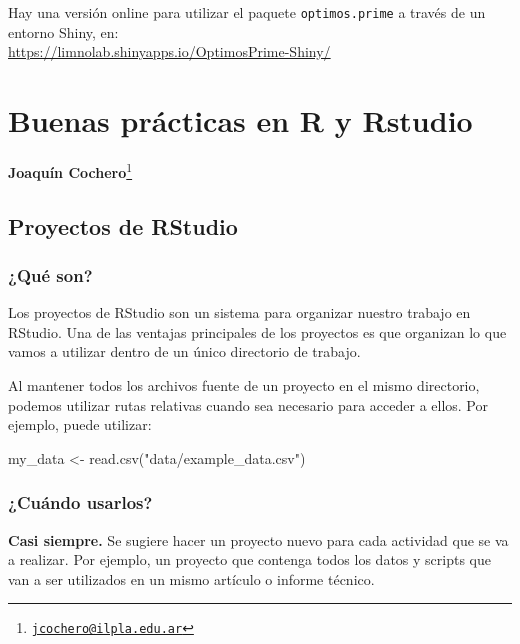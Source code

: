 \documentclass[
]{book}
\newenvironment{Shaded}{\begin{snugshade}}{\end{snugshade}}
\newcommand{\FunctionTok}[1]{\textcolor[rgb]{0.00,0.00,0.00}{#1}}
\newcommand{\NormalTok}[1]{#1}
\newcommand{\OtherTok}[1]{\textcolor[rgb]{0.56,0.35,0.01}{#1}}
\newcommand{\StringTok}[1]{\textcolor[rgb]{0.31,0.60,0.02}{#1}}
\begin{document}
Hay una versión online para utilizar el paquete \texttt{optimos.prime} a través de un entorno Shiny, en:\\
\url{https://limnolab.shinyapps.io/OptimosPrime-Shiny/}

\hypertarget{buenaspracticas}{%
\chapter{Buenas prácticas en R y Rstudio}\label{buenaspracticas}}

\textbf{Joaquín Cochero}\footnote{\href{mailto:jcochero@ilpla.edu.ar}{\nolinkurl{jcochero@ilpla.edu.ar}}}

\hypertarget{proyectos-de-rstudio}{%
\section{Proyectos de RStudio}\label{proyectos-de-rstudio}}

\hypertarget{quuxe9-son}{%
\subsection{¿Qué son?}\label{quuxe9-son}}

Los proyectos de RStudio son un sistema para organizar nuestro trabajo en RStudio. Una de las ventajas principales de los proyectos es que organizan lo que vamos a utilizar dentro de un único directorio de trabajo.

Al mantener todos los archivos fuente de un proyecto en el mismo directorio, podemos utilizar rutas relativas cuando sea necesario para acceder a ellos. Por ejemplo, puede utilizar:

\begin{Shaded}
\begin{Highlighting}[]
\NormalTok{my\_data }\OtherTok{\textless{}{-}} \FunctionTok{read.csv}\NormalTok{(}\StringTok{"data/example\_data.csv"}\NormalTok{)}
\end{Highlighting}
\end{Shaded}

\hypertarget{cuuxe1ndo-usarlos}{%
\subsection{¿Cuándo usarlos?}\label{cuuxe1ndo-usarlos}}

\textbf{Casi siempre.} Se sugiere hacer un proyecto nuevo para cada actividad que se va a realizar. Por ejemplo, un proyecto que contenga todos los datos y scripts que van a ser utilizados en un mismo artículo o informe técnico.
\end{document}
